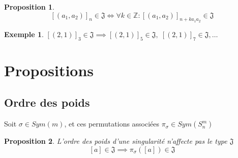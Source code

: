 \documentclass{article}
\newtheorem{proposition}{Proposition}
\newtheorem{example}{Exemple}
\begin{document}
\begin{proposition}
    \[ 
    {[(a_1, a_2)]}_n \in \mathfrak{J} \iff 
    \forall k \in \mathbb{Z}: {[(a_1, a_2)]}_{n+ka_1a_2} \in \mathfrak{J} 
    \]
\end{proposition}

\begin{example}
    ${[(2, 1)]}_3 \in \mathfrak{J} \implies {[(2, 1)]}_5 \in \mathfrak{J},\; {[(2, 1)]}_7 \in \mathfrak{J}, \dots$
\end{example}

\newpage

\section{Propositions}

\subsection{Ordre des poids}

Soit $\sigma \in Sym(m)$, et ces permutations associées $\pi_{\sigma} \in Sym(S_n^m)$

\begin{proposition}
    L'ordre des poids d'une singularité n'affecte pas le type $\mathfrak{J}$
    \[ [a] \in \mathfrak{J} \implies \pi_{\sigma}([a]) \in \mathfrak{J} \]
\end{proposition}
\end{document}
